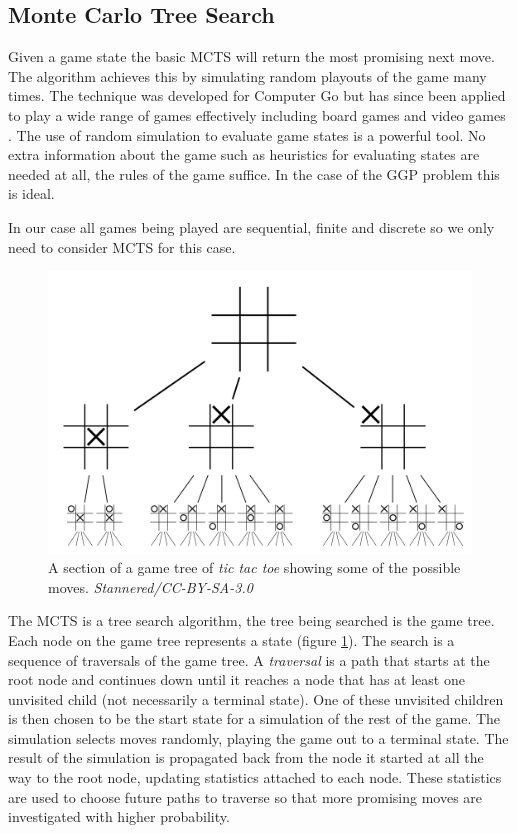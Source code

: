 \subsection{Monte Carlo Tree Search}
Given a game state the basic MCTS will return the most promising next move. The algorithm achieves this by simulating random playouts of the game many times. The technique was developed for Computer Go but has since been applied to play a wide range of games effectively including board games and video games \cite{Silver/MCTS,Chaslot/MCTS}. The use of random simulation to evaluate game states is a powerful tool. No extra information about the game such as heuristics for evaluating states are needed at all, the rules of the game suffice. In the case of the GGP problem this is ideal.

In our case all games being played are sequential, finite and discrete so we only need to consider MCTS for this case.

\begin{figure}[ht]
	\centering
	\includegraphics[width=0.9\linewidth]{Tic-tac-toe-game-tree.png}
	\caption{A section of a game tree of \textit{tic tac toe} showing some of the possible moves. \textit{Stannered/CC-BY-SA-3.0}}
	\label{fig:game-tree}
\end{figure}

The MCTS is a tree search algorithm, the tree being searched is the game tree. Each node on the game tree represents a state (figure \ref{fig:game-tree}). The search is a sequence of traversals of the game tree. A \textit{traversal} is a path that starts at the root node and continues down until it reaches a node that has at least one unvisited child (not necessarily a terminal state). One of these unvisited children is then chosen to be the start state for a simulation of the rest of the game. The simulation selects moves randomly, playing the game out to a terminal state. The result of the simulation is propagated back from the node it started at all the way to the root node, updating statistics attached to each node. These statistics are used to choose future paths to traverse so that more promising moves are investigated with higher probability.

